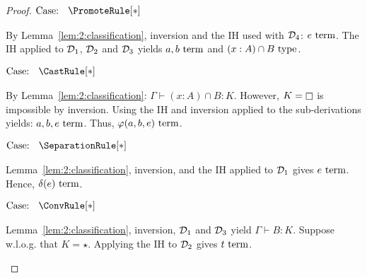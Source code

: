 \begin{proof}
    $\text{Case: }\begin{array}{c} \PromoteRule[*] \end{array}$
    \begin{proofcase}
        By Lemma~\ref{lem:2:classification}, inversion and the IH used with $\mathcal{D}_{4}$: $e~\textnormal{term}$.
        The IH applied to $\mathcal{D}_{1}$, $\mathcal{D}_{2}$ and $\mathcal{D}_{3}$ yields $a, b~\textnormal{term}$ and $(x : A) \cap B~\textnormal{type}$.
    \end{proofcase}

    $\text{Case: }\begin{array}{c} \CastRule[*] \end{array}$
    \begin{proofcase}
        By Lemma~\ref{lem:2:classification}: $\Gamma \vdash (x : A) \cap B : K$.
        However, $K = \kind$ is impossible by inversion.
        Using the IH and inversion applied to the sub-derivations yields: $a, b, e~\textnormal{term}$.
        Thus, $\varphi(a, b, e)~\textnormal{term}$.
    \end{proofcase}

    $\text{Case: }\begin{array}{c} \SeparationRule[*] \end{array}$
    \begin{proofcase}
        Lemma~\ref{lem:2:classification}, inversion, and the IH applied to $\mathcal{D}_{1}$ gives $e~\textnormal{term}$.
        Hence, $\delta(e)~\textnormal{term}$.
    \end{proofcase}

    $\text{Case: }\begin{array}{c} \ConvRule[*] \end{array}$
    \begin{proofcase}
        Lemma~\ref{lem:2:classification}, inversion, $\mathcal{D}_{1}$ and $\mathcal{D}_{3}$ yield $\Gamma \vdash B : K$.
        Suppose w.l.o.g. that $K = \star$.
        Applying the IH to $\mathcal{D}_{2}$ gives $t~\textnormal{term}$.
    \end{proofcase}
\end{proof}
